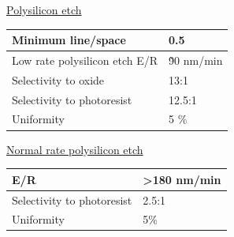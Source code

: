 \begin{minipage}[H]{\MachineTextMiniPageWidth}
	\underline{Polysilicon etch}

	\begin{tabular}{|p{5cm}|p{6cm}|}
		\hline
		Minimum line/space &
		0.5\um \\
		\hline
		Low rate polysilicon etch E/R &
		\~ 90 nm/min \\
		\hline
		Selectivity to oxide &
		13:1 \\
		\hline
		Selectivity to photoresist &
		12.5:1 \\
		\hline
		Uniformity &
		5 \% \\
		\hline
	\end{tabular}

	\underline{Normal rate polysilicon etch}

	\begin{tabular}{|p{5cm}|p{6cm}|}
		\hline
		E/R &
		>180 nm/min \\
		\hline
		Selectivity to photoresist &
		2.5:1 \\
		\hline
		Uniformity &
		5\% \\
		\hline
	\end{tabular}
\end{minipage}